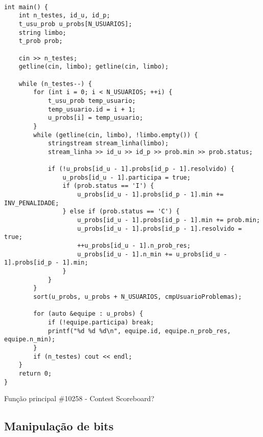\documentclass[a4paper,12pt]{scrartcl}
\begin{document}
\begin{listing}[H]
\begin{verbatim}

int main() {
    int n_testes, id_u, id_p;
    t_usu_prob u_probs[N_USUARIOS];
    string limbo;
    t_prob prob;
    
    cin >> n_testes;
    getline(cin, limbo); getline(cin, limbo);

    while (n_testes--) {
        for (int i = 0; i < N_USUARIOS; ++i) {
            t_usu_prob temp_usuario;
            temp_usuario.id = i + 1;
            u_probs[i] = temp_usuario;
        }
        while (getline(cin, limbo), !limbo.empty()) {
            stringstream stream_linha(limbo);
            stream_linha >> id_u >> id_p >> prob.min >> prob.status;

            if (!u_probs[id_u - 1].probs[id_p - 1].resolvido) {
                u_probs[id_u - 1].participa = true;
                if (prob.status == 'I') {
                    u_probs[id_u - 1].probs[id_p - 1].min += INV_PENALIDADE;
                } else if (prob.status == 'C') {
                    u_probs[id_u - 1].probs[id_p - 1].min += prob.min;
                    u_probs[id_u - 1].probs[id_p - 1].resolvido = true;
                    ++u_probs[id_u - 1].n_prob_res;
                    u_probs[id_u - 1].n_min += u_probs[id_u - 1].probs[id_p - 1].min;
                }
            }
        }
        sort(u_probs, u_probs + N_USUARIOS, cmpUsuarioProblemas);
        
        for (auto &equipe : u_probs) {
            if (!equipe.participa) break;
            printf("%d %d %d\n", equipe.id, equipe.n_prob_res, equipe.n_min);
        }
        if (n_testes) cout << endl;
    }
    return 0;
}
\end{verbatim}
\caption{\footnotesize{Função principal \#10258 - Contest Scoreboard?}}
\end{listing}

\subsection{Manipulação de bits}
\end{document}
